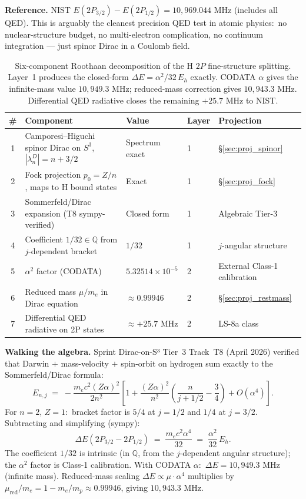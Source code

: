 \documentclass[11pt]{article}
\begin{document}
\textbf{Reference.} NIST $E(2P_{3/2}) - E(2P_{1/2}) = 10{,}969.044$ MHz
(includes all QED).  This is arguably the cleanest precision QED
test in atomic physics:\ no nuclear-structure budget, no
multi-electron complication, no continuum integration --- just
spinor Dirac in a Coulomb field.

\begin{table}[h!]
\centering\small
\caption{Six-component Roothaan decomposition of the H $2P$
fine-structure splitting.  Layer~1 produces the closed-form
$\Delta E = \alpha^2/32\,E_h$ exactly.  CODATA $\alpha$ gives the
infinite-mass value $10{,}949.3$ MHz; reduced-mass correction gives
$10{,}943.3$ MHz.  Differential QED radiative closes the remaining
$+25.7$ MHz to NIST.}
\label{tab:autopsy_h_2p_fs}
\begin{tabular}{cllll}
\toprule
\# & Component & Value & Layer & Projection \\
\midrule
1 & Camporesi--Higuchi spinor Dirac on $S^3$, $|\lambda_n^D| = n + 3/2$ & Spectrum exact & 1 & \S\ref{sec:proj_spinor} \\
2 & Fock projection $p_0 = Z/n$, maps to H bound states & Exact & 1 & \S\ref{sec:proj_fock} \\
3 & Sommerfeld/Dirac expansion (T8 sympy-verified) & Closed form & 1 & Algebraic Tier-3 \\
4 & Coefficient $1/32 \in \mathbb{Q}$ from $j$-dependent bracket & $1/32$ & 1 & $j$-angular structure \\
5 & $\alpha^2$ factor (CODATA) & $5.32514 \times 10^{-5}$ & 2 & External Class-1 calibration \\
6 & Reduced mass $\mu/m_e$ in Dirac equation & $\approx 0.99946$ & 2 & \S\ref{sec:proj_restmass} \\
7 & Differential QED radiative on 2P states & $\approx +25.7$ MHz & 2 & LS-8a class \\
\bottomrule
\end{tabular}
\end{table}

\textbf{Walking the algebra.}  Sprint Dirac-on-S³ Tier~3 Track~T8
(April 2026) verified that Darwin $+$ mass-velocity $+$ spin-orbit
on hydrogen sum exactly to the Sommerfeld/Dirac formula:
\begin{equation*}
E_{n,j} \;=\; -\frac{m_e c^2 (Z\alpha)^2}{2n^2}\left[1 + \frac{(Z\alpha)^2}{n^2}\left(\frac{n}{j+1/2} - \frac{3}{4}\right) + O(\alpha^4)\right].
\end{equation*}
For $n=2$, $Z=1$:\ bracket factor is $5/4$ at $j=1/2$ and $1/4$ at
$j=3/2$.  Subtracting and simplifying (sympy):\
\begin{equation*}
\Delta E(2P_{3/2} - 2P_{1/2}) \;=\; \frac{m_e c^2 \alpha^4}{32} \;=\; \frac{\alpha^2}{32}\, E_h.
\end{equation*}
The coefficient $1/32$ is intrinsic (in $\mathbb{Q}$, from the
$j$-dependent angular structure); the $\alpha^2$ factor is Class-1
calibration.  With CODATA $\alpha$:\ $\Delta E = 10{,}949.3$ MHz
(infinite mass).  Reduced-mass scaling
$\Delta E \propto \mu \cdot \alpha^4$ multiplies by
$\mu_{\mathrm{red}}/m_e = 1 - m_e/m_p \approx 0.99946$, giving
$10{,}943.3$ MHz.
\end{document}
